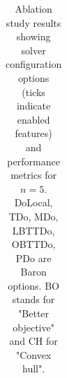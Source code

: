 \documentclass[11pt,reqno,a4paper]{amsart}
\numberwithin{equation}{section}
\theoremstyle{mytheorem}
\theoremstyle{myremark}
\theoremstyle{myparagraph}
\begin{document}
\begin{table}[ht]
\begin{threeparttable}
\begin{tabular}{l c c c c c c c c c r r r}
                \bottomrule
            \end{tabular}
            \begin{tablenotes}
                \footnotesize
            \end{tablenotes}
        \end{threeparttable}
        \caption{Ablation study results showing solver configuration options (ticks indicate enabled features) and performance metrics for $n=5$.
        DoLocal, TDo, MDo, LBTTDo, OBTTDo, PDo are Baron options. BO stands for "Better objective" and CH for "Convex hull".}
        \label{tab:ablation_configs}
    \end{table}

    \newpage
    \printbibliography
\end{document}
